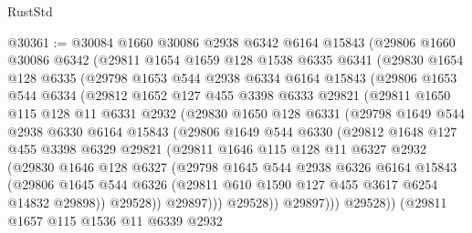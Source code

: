 \begin{lexlean}{RustStd}
\begin{coremodule}
@30361 := @30084
    @1660
    @30086
    @2938
    @6342
    @6164
    @15843
    (@29806
      @1660
      @30086
      @6342
      (@29811
        @1654
        @1659
        @128
        @1538
        @6335
        @6341
        (@29830
          @1654
          @128
          @6335
          (@29798
            @1653
            @544
            @2938
            @6334
            @6164
            @15843
            (@29806
              @1653
              @544
              @6334
              (@29812
                @1652
                @127
                @455
                @3398
                @6333
                @29821
                (@29811
                  @1650
                  @115
                  @128
                  @11
                  @6331
                  @2932
                  (@29830
                    @1650
                    @128
                    @6331
                    (@29798
                      @1649
                      @544
                      @2938
                      @6330
                      @6164
                      @15843
                      (@29806
                        @1649
                        @544
                        @6330
                        (@29812
                          @1648
                          @127
                          @455
                          @3398
                          @6329
                          @29821
                          (@29811
                            @1646
                            @115
                            @128
                            @11
                            @6327
                            @2932
                            (@29830
                              @1646
                              @128
                              @6327
                              (@29798
                                @1645
                                @544
                                @2938
                                @6326
                                @6164
                                @15843
                                (@29806
                                  @1645
                                  @544
                                  @6326
                                  (@29811 @610 @1590 @127 @455 @3617 @6254 @14832 @29898))
                                @29528))
                            @29897)))
                      @29528))
                  @29897)))
            @29528))
        (@29811
          @1657
          @115
          @1536
          @11
          @6339
          @2932

\end{coremodule}
\end{lexlean}
